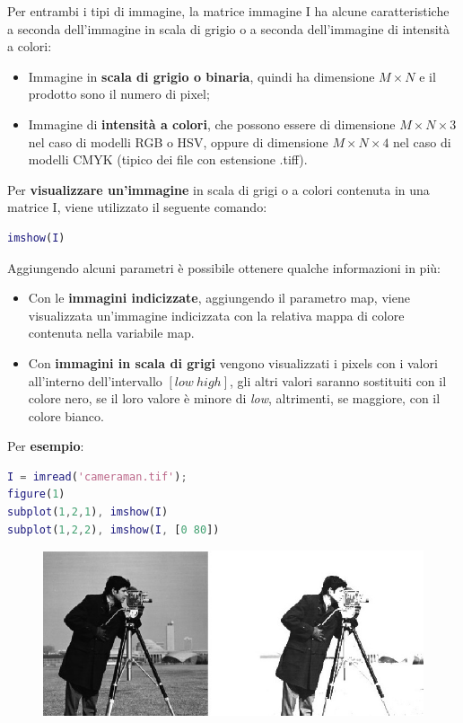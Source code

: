\documentclass[a4paper]{article}
\begin{document}
	\noindent
	Per entrambi i tipi di immagine, la matrice immagine \textsf{I} ha alcune caratteristiche a seconda dell'immagine in scala di grigio o a seconda dell'immagine di intensità a colori:
	\begin{itemize}[label=-]
		\item Immagine in \textbf{scala di grigio o binaria}, quindi ha dimensione $M \times N$ e il prodotto sono il numero di pixel;
		
		\item Immagine di \textbf{intensità a colori}, che possono essere di dimensione $M \times N \times 3$ nel caso di modelli RGB o HSV, oppure di dimensione $M \times N \times 4$ nel caso di modelli CMYK (tipico dei file con estensione \textsf{.tiff}).
	\end{itemize}
	Per \textbf{visualizzare un'immagine} in scala di grigi o a colori contenuta in una matrice \textsf{I}, viene utilizzato il seguente comando:
	\begin{lstlisting}[language=MATLAB]
imshow(I)\end{lstlisting}
	Aggiungendo alcuni parametri è possibile ottenere qualche informazioni in più:
	\begin{itemize}
		\item Con le \textbf{immagini indicizzate}, aggiungendo il parametro \textsf{map}, viene visualizzata un'immagine indicizzata con la relativa mappa di colore contenuta nella variabile \textsf{map}.
		
		\item Con \textbf{immagini in scala di grigi} vengono visualizzati i pixels con i valori all'interno dell'intervallo $\left[low \: high\right]$, gli altri valori saranno sostituiti con il colore nero, se il loro valore è minore di \emph{low}, altrimenti, se maggiore, con il colore bianco.
	\end{itemize}
	Per \textcolor{Green4}{\textbf{esempio}}:
	\begin{lstlisting}[language=MATLAB]
I = imread('cameraman.tif');
figure(1)
subplot(1,2,1), imshow(I)
subplot(1,2,2), imshow(I, [0 80])\end{lstlisting}
	\begin{figure}[!htp]
		\centering
		\includegraphics[width=\textwidth]{img/lab/visualizzazione-segnali_6.jpg}
	\end{figure}
	
\end{document}
